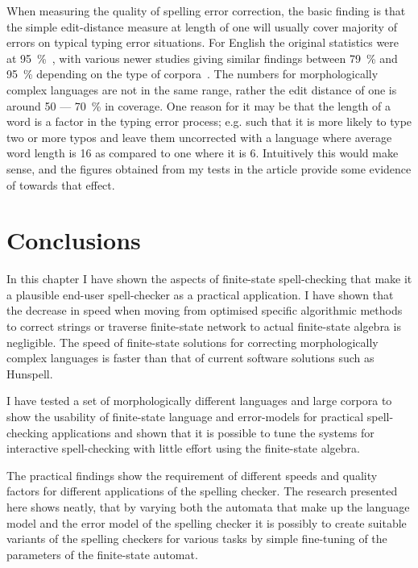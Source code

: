 \documentclass[officiallayout,draft]{unihelcompling}
\begin{document}
When measuring the quality of spelling error correction, the basic finding is
that the simple edit-distance measure at length of one will usually cover
majority of errors on typical typing error situations. For English the original
statistics were at 95~\%~\citep{damerau1964technique}, with various newer
studies giving similar findings between 79~\% and 95~\% depending on the type
of corpora~\citep{kukich1992spelling}.  The numbers for morphologically complex
languages are not in the same range, rather the edit distance of one is around
50 --- 70~\% in coverage. One reason for it may be that the length of a word is
a factor in the typing error process; e.g. such that it is more likely to type
two or more typos and leave them uncorrected with a language where average word
length is 16 as compared to one where it is 6. Intuitively this would make
sense, and the figures obtained from my tests in the article provide some
evidence of towards that effect.

\section{Conclusions}

In this chapter I have shown the aspects of finite-state spell-checking that
make it a plausible end-user spell-checker as a practical application. I have
shown that the decrease in speed when moving from optimised specific
algorithmic methods to correct strings or traverse finite-state network to
actual finite-state algebra is negligible. The speed of finite-state solutions
for correcting morphologically complex languages is faster than
that of current software solutions such as Hunspell.

I have tested a set of morphologically different languages and
large corpora to show the usability of finite-state language and error-models
for practical spell-checking applications and shown that it is possible to tune
the systems for interactive spell-checking with little effort using the
finite-state algebra.

The practical findings show the requirement of different speeds and quality
factors for different applications of the spelling checker. The research
presented here shows neatly, that by varying both the automata that make up
the language model and the error model of the spelling checker it is possibly
to create suitable variants of the spelling checkers for various tasks by
simple fine-tuning of the parameters of the finite-state automat.
\end{document}
